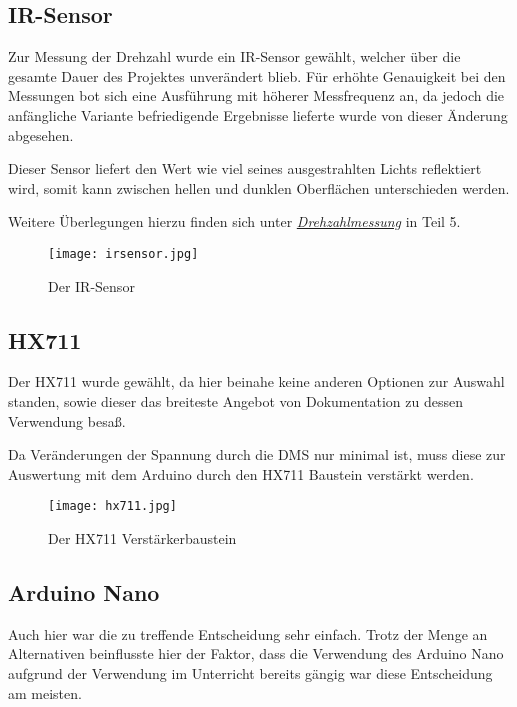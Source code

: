 \subsection{IR-Sensor}

Zur Messung der Drehzahl wurde ein IR-Sensor gewählt, welcher über die gesamte Dauer des Projektes unverändert blieb.
Für erhöhte Genauigkeit bei den Messungen bot sich eine Ausführung mit höherer Messfrequenz an, da jedoch die anfängliche Variante befriedigende Ergebnisse lieferte wurde von dieser Änderung abgesehen.

Dieser Sensor liefert den Wert wie viel seines ausgestrahlten Lichts reflektiert wird, somit kann zwischen hellen und dunklen Oberflächen unterschieden werden.

Weitere Überlegungen hierzu finden sich unter \hyperref[drehzahlmessung]{\textit{Drehzahlmessung}} in Teil 5.

\begin{figure}[H]
    \begin{center}
        \texttt{[image: irsensor.jpg]}
        \caption{Der IR-Sensor}
    \end{center}
\end{figure}

\subsection{HX711}

Der HX711 wurde gewählt, da hier beinahe keine anderen Optionen zur Auswahl standen, sowie dieser das breiteste Angebot von Dokumentation zu dessen Verwendung besaß.

Da Veränderungen der Spannung durch die DMS nur minimal ist, muss diese zur Auswertung mit dem Arduino durch den HX711 Baustein verstärkt werden.

\begin{figure}[H]
    \begin{center}
        \texttt{[image: hx711.jpg]}
        \caption{Der HX711 Verstärkerbaustein}
    \end{center}
\end{figure}

\subsection{Arduino Nano}

Auch hier war die zu treffende Entscheidung sehr einfach.
Trotz der Menge an Alternativen beinflusste hier der Faktor, dass die Verwendung des Arduino Nano aufgrund der Verwendung im Unterricht bereits gängig war diese Entscheidung am meisten.

